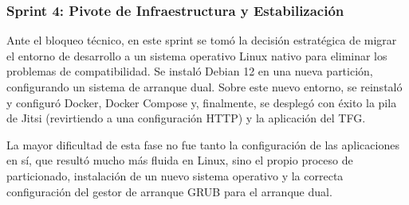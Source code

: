 \subsubsection{Sprint 4: Pivote de Infraestructura y Estabilización}
Ante el bloqueo técnico, en este sprint se tomó la decisión estratégica de migrar el entorno de desarrollo a un sistema operativo Linux nativo para eliminar los problemas de compatibilidad. Se instaló Debian 12 en una nueva partición, configurando un sistema de arranque dual. Sobre este nuevo entorno, se reinstaló y configuró Docker, Docker Compose y, finalmente, se desplegó con éxito la pila de Jitsi (revirtiendo a una configuración HTTP) y la aplicación del TFG.

\begin{table}[H]
    \centering
    \caption{Tareas principales de los Sprints 3 y 4.}
    \label{tab:sprint3_4}
\end{table}

La mayor dificultad de esta fase no fue tanto la configuración de las aplicaciones en sí, que resultó mucho más fluida en Linux, sino el propio proceso de particionado, instalación de un nuevo sistema operativo y la correcta configuración del gestor de arranque GRUB para el arranque dual.

